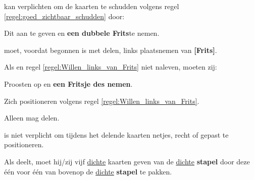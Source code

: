 \vervolgLijst{}
    \item \Frits kan \eenSpeler verplichten om de kaarten te schudden volgens regel \ref{regel:goed_zichtbaar_schudden} door:
    \puntLijst{}
        \item Dit aan te geven en \textbf{een dubbele Frits}\footnotemark[3] te nemen.
    \eindPuntLijst{}
\eindLijst{}


\vervolgLijst{}
    \item \Willem moet, voordat \Frits begonnen is met delen, links plaatsnemen van \textbf{[Frits]}.
    \label{regel:Willen_links_van_Frits}
\eindLijst{}

\vervolgLijst{}
    \item Als \Frits en \Willem regel \ref{regel:Willen_links_van_Frits} niet naleven, moeten zij:
    \puntLijst{}
        \item Proosten op  en \textbf{een Fritsje des nemen}\footnotemark[1].
        \item Zich positioneren volgens regel \ref{regel:Willen_links_van_Frits}.
    \eindPuntLijst{}
\eindLijst{}


\newpage
{}
\label{sec:beginfase_einde}


\vervolgLijst{}
    \item Alleen \Frits mag delen\footnotemark[1].
    \label{regel:delen_Frits}
\eindLijst{}

\vervolgLijst{}
    \item \Frits is niet verplicht om tijdens het delen\footnotemark[1] de kaarten netjes, recht of gepast te positioneren.
\eindLijst{}

\vervolgLijst{}
    \item Als \Frits deelt\footnotemark[1], moet hij/zij \alleSpelers vijf \ul{dichte} kaarten geven van de \ul{dichte} \textbf{stapel} door deze één voor één van bovenop de \ul{dichte} \textbf{stapel} te pakken.
    \label{regel:delen_Frits_5_kaarten_1}
\eindLijst{}

